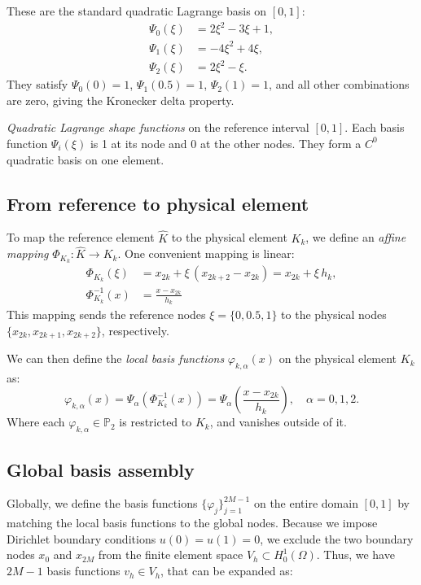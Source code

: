 \documentclass[a4paper,10pt]{article}
\begin{document}
These are the standard quadratic Lagrange basis on \([0,1]\):
\begin{align*}
	\Psi_0(\xi) & = 2\xi^2 - 3\xi + 1, \\
	\Psi_1(\xi) & = -4\xi^2 + 4\xi,    \\
	\Psi_2(\xi) & = 2\xi^2 - \xi.
\end{align*}
They satisfy \(\Psi_0(0)=1\), \(\Psi_1(0.5)=1\), \(\Psi_2(1)=1\), and all other combinations are zero, giving the Kronecker delta property.

\emph{Quadratic Lagrange shape functions} on the reference interval \([0,1]\).
Each basis function \(\Psi_i(\xi)\) is 1 at its node and 0 at the other nodes. They form a \(C^0\) quadratic basis on one element.

\subsection*{From reference to physical element}
To map the reference element \(\hat K\) to the physical element \(K_k\), we define an \emph{affine mapping} \(\Phi_{K_k}: \hat K \to K_k\).
One convenient mapping is linear:
\begin{align*}
	\Phi_{K_k}(\xi)    & = x_{2k} + \xi\, (x_{2k+2}-x_{2k}) = x_{2k} + \xi\, h_k, \\
	\Phi_{K_k}^{-1}(x) & = \frac{x-x_{2k}}{h_k}
\end{align*}
This mapping sends the reference nodes \(\xi=\{0,0.5,1\}\) to the physical nodes \(\{x_{2k}, x_{2k+1}, x_{2k+2}\}\), respectively.

We can then define the \emph{local basis functions} \(\varphi_{k,\alpha}(x)\) on the physical element \(K_k\) as:
\[
	\varphi_{k,\alpha}(x) = \Psi_\alpha(\Phi_{K_k}^{-1}(x)) = \Psi_\alpha\left(\frac{x-x_{2k}}{h_k}\right), \quad \alpha=0,1,2.
\]
Where each \(\varphi_{k,\alpha} \in \mathbb{P}_2\) is restricted to \(K_k\), and vanishes outside of it.

\subsection*{Global basis assembly}
Globally, we define the basis functions \(\{\varphi_j\}_{j=1}^{2M-1}\) on the entire domain \([0,1]\) by matching the local basis functions to the global nodes. 
Because we impose Dirichlet boundary conditions \(u(0)=u(1)=0\), we exclude the two boundary nodes \(x_0\) and \(x_{2M}\) from the finite element space \(V_h \subset H^1_0(\Omega)\).
Thus, we have \(2M - 1\) basis functions \(v_h \in V_h\), that can be expanded as:
\end{document}
